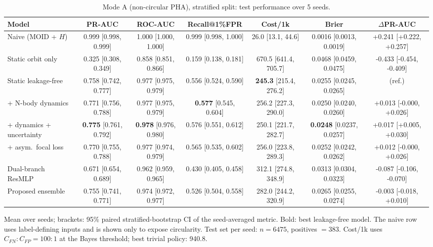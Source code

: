 \begin{table}[t]
\centering
\small
\caption{Mode A (non-circular PHA), stratified split: test performance over 5 seeds.}
\label{tab:pha_stratified_all}
\begin{tabular}{lcccccc}
\toprule
Model & PR-AUC & ROC-AUC & Recall@1\%FPR & Cost/1k & Brier & $\Delta$PR-AUC \\
\midrule
Naive (MOID + $H$) & 0.999 \scriptsize{[0.998, 0.999]} & 1.000 \scriptsize{[1.000, 1.000]} & 0.999 \scriptsize{[0.998, 1.000]} & 26.0 \scriptsize{[13.1, 44.6]} & 0.0016 \scriptsize{[0.0013, 0.0019]} & +0.241 \scriptsize{[+0.222, +0.257]} \\
\midrule
Static orbit only & 0.325 \scriptsize{[0.308, 0.349]} & 0.858 \scriptsize{[0.851, 0.866]} & 0.159 \scriptsize{[0.138, 0.181]} & 670.5 \scriptsize{[641.4, 705.7]} & 0.0468 \scriptsize{[0.0459, 0.0475]} & -0.433 \scriptsize{[-0.454, -0.409]} \\
Static leakage-free & 0.758 \scriptsize{[0.742, 0.777]} & 0.977 \scriptsize{[0.975, 0.979]} & 0.556 \scriptsize{[0.524, 0.590]} & \textbf{245.3} \scriptsize{[215.4, 276.2]} & 0.0255 \scriptsize{[0.0245, 0.0265]} & (ref.) \\
+ N-body dynamics & 0.771 \scriptsize{[0.756, 0.788]} & 0.977 \scriptsize{[0.975, 0.979]} & \textbf{0.577} \scriptsize{[0.545, 0.604]} & 256.2 \scriptsize{[227.3, 290.0]} & 0.0250 \scriptsize{[0.0240, 0.0260]} & +0.013 \scriptsize{[-0.000, +0.026]} \\
+ dynamics + uncertainty & \textbf{0.775} \scriptsize{[0.761, 0.792]} & \textbf{0.978} \scriptsize{[0.976, 0.980]} & 0.576 \scriptsize{[0.551, 0.612]} & 250.1 \scriptsize{[221.7, 282.7]} & \textbf{0.0248} \scriptsize{[0.0237, 0.0257]} & +0.017 \scriptsize{[+0.005, +0.030]} \\
+ asym.\ focal loss & 0.770 \scriptsize{[0.755, 0.788]} & 0.977 \scriptsize{[0.974, 0.979]} & 0.565 \scriptsize{[0.535, 0.602]} & 256.0 \scriptsize{[223.8, 289.3]} & 0.0252 \scriptsize{[0.0242, 0.0262]} & +0.012 \scriptsize{[-0.000, +0.026]} \\
Dual-branch ResMLP & 0.671 \scriptsize{[0.654, 0.689]} & 0.962 \scriptsize{[0.959, 0.965]} & 0.430 \scriptsize{[0.405, 0.458]} & 312.1 \scriptsize{[274.8, 348.9]} & 0.0313 \scriptsize{[0.0304, 0.0323]} & -0.087 \scriptsize{[-0.106, -0.070]} \\
Proposed ensemble & 0.755 \scriptsize{[0.741, 0.771]} & 0.974 \scriptsize{[0.972, 0.977]} & 0.526 \scriptsize{[0.504, 0.558]} & 282.0 \scriptsize{[244.2, 320.9]} & 0.0265 \scriptsize{[0.0255, 0.0274]} & -0.003 \scriptsize{[-0.018, +0.010]} \\
\bottomrule
\end{tabular}
\par\vspace{2pt}\footnotesize Mean over seeds; brackets: 95\% paired stratified-bootstrap CI of the seed-averaged metric. Bold: best leakage-free model. The naive row uses label-defining inputs and is shown only to expose circularity. Test set per seed: $n=6475$, positives $=383$. Cost/1k uses $C_{FN}{:}C_{FP}=100{:}1$ at the Bayes threshold; best trivial policy: 940.8.
\end{table}
